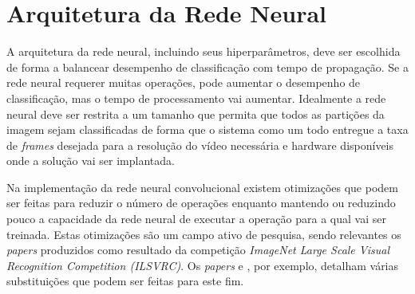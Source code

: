 \section{Arquitetura da Rede Neural}

A arquitetura da rede neural, incluindo seus hiperparâmetros, deve ser
escolhida de forma a balancear desempenho de classificação com tempo de
propagação. Se a rede neural requerer muitas operações, pode aumentar o
desempenho de classificação, mas o tempo de processamento vai aumentar.
Idealmente a rede neural deve ser restrita a um tamanho que permita que todos
as partições da imagem sejam classificadas de forma que o sistema como um todo
entregue a taxa de \emph{frames} desejada para a resolução do vídeo necessária
e hardware disponíveis onde a solução vai ser implantada.

Na implementação da rede neural convolucional existem otimizações que podem ser
feitas para reduzir o número de operações enquanto mantendo ou reduzindo pouco
a capacidade da rede neural de executar a operação para a qual vai ser
treinada. Estas otimizações são um campo ativo de pesquisa, sendo relevantes os
\emph{papers} produzidos como resultado da competição \emph{ImageNet Large
Scale Visual Recognition Competition (ILSVRC)}. Os \emph{papers}
\cite{szegedy2015going} e \cite{szegedy2015rethinking},
por exemplo, detalham várias substituições que podem ser feitas para este fim.


